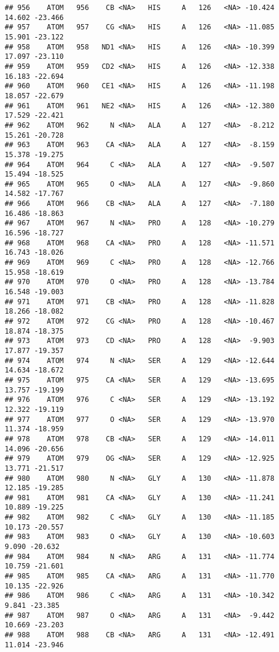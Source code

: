 \documentclass[
]{article}
\begin{document}
\begin{verbatim}
## 956    ATOM   956    CB <NA>   HIS     A   126   <NA> -10.424  14.602 -23.466
## 957    ATOM   957    CG <NA>   HIS     A   126   <NA> -11.085  15.901 -23.122
## 958    ATOM   958   ND1 <NA>   HIS     A   126   <NA> -10.399  17.097 -23.110
## 959    ATOM   959   CD2 <NA>   HIS     A   126   <NA> -12.338  16.183 -22.694
## 960    ATOM   960   CE1 <NA>   HIS     A   126   <NA> -11.198  18.057 -22.679
## 961    ATOM   961   NE2 <NA>   HIS     A   126   <NA> -12.380  17.529 -22.421
## 962    ATOM   962     N <NA>   ALA     A   127   <NA>  -8.212  15.261 -20.728
## 963    ATOM   963    CA <NA>   ALA     A   127   <NA>  -8.159  15.378 -19.275
## 964    ATOM   964     C <NA>   ALA     A   127   <NA>  -9.507  15.494 -18.525
## 965    ATOM   965     O <NA>   ALA     A   127   <NA>  -9.860  14.582 -17.767
## 966    ATOM   966    CB <NA>   ALA     A   127   <NA>  -7.180  16.486 -18.863
## 967    ATOM   967     N <NA>   PRO     A   128   <NA> -10.279  16.596 -18.727
## 968    ATOM   968    CA <NA>   PRO     A   128   <NA> -11.571  16.743 -18.026
## 969    ATOM   969     C <NA>   PRO     A   128   <NA> -12.766  15.958 -18.619
## 970    ATOM   970     O <NA>   PRO     A   128   <NA> -13.784  16.548 -19.003
## 971    ATOM   971    CB <NA>   PRO     A   128   <NA> -11.828  18.266 -18.082
## 972    ATOM   972    CG <NA>   PRO     A   128   <NA> -10.467  18.874 -18.375
## 973    ATOM   973    CD <NA>   PRO     A   128   <NA>  -9.903  17.877 -19.357
## 974    ATOM   974     N <NA>   SER     A   129   <NA> -12.644  14.634 -18.672
## 975    ATOM   975    CA <NA>   SER     A   129   <NA> -13.695  13.757 -19.199
## 976    ATOM   976     C <NA>   SER     A   129   <NA> -13.192  12.322 -19.119
## 977    ATOM   977     O <NA>   SER     A   129   <NA> -13.970  11.374 -18.959
## 978    ATOM   978    CB <NA>   SER     A   129   <NA> -14.011  14.096 -20.656
## 979    ATOM   979    OG <NA>   SER     A   129   <NA> -12.925  13.771 -21.517
## 980    ATOM   980     N <NA>   GLY     A   130   <NA> -11.878  12.185 -19.285
## 981    ATOM   981    CA <NA>   GLY     A   130   <NA> -11.241  10.889 -19.225
## 982    ATOM   982     C <NA>   GLY     A   130   <NA> -11.185  10.173 -20.557
## 983    ATOM   983     O <NA>   GLY     A   130   <NA> -10.603   9.090 -20.632
## 984    ATOM   984     N <NA>   ARG     A   131   <NA> -11.774  10.759 -21.601
## 985    ATOM   985    CA <NA>   ARG     A   131   <NA> -11.770  10.135 -22.926
## 986    ATOM   986     C <NA>   ARG     A   131   <NA> -10.342   9.841 -23.385
## 987    ATOM   987     O <NA>   ARG     A   131   <NA>  -9.442  10.669 -23.203
## 988    ATOM   988    CB <NA>   ARG     A   131   <NA> -12.491  11.014 -23.946

\end{verbatim}
\end{document}
